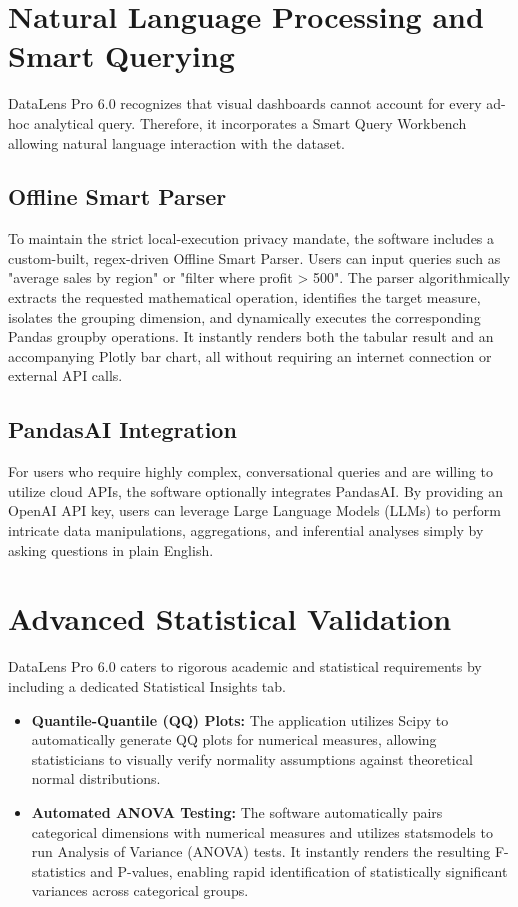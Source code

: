 \documentclass[12pt, a4paper]{article}
\begin{document}
\section{Natural Language Processing and Smart Querying}
DataLens Pro 6.0 recognizes that visual dashboards cannot account for every ad-hoc analytical query. Therefore, it incorporates a Smart Query Workbench allowing natural language interaction with the dataset.
\subsection{Offline Smart Parser}
To maintain the strict local-execution privacy mandate, the software includes a custom-built, regex-driven Offline Smart Parser. Users can input queries such as "average sales by region" or "filter where profit > 500". The parser algorithmically extracts the requested mathematical operation, identifies the target measure, isolates the grouping dimension, and dynamically executes the corresponding Pandas groupby operations. It instantly renders both the tabular result and an accompanying Plotly bar chart, all without requiring an internet connection or external API calls.
\subsection{PandasAI Integration}
For users who require highly complex, conversational queries and are willing to utilize cloud APIs, the software optionally integrates PandasAI. By providing an OpenAI API key, users can leverage Large Language Models (LLMs) to perform intricate data manipulations, aggregations, and inferential analyses simply by asking questions in plain English.
\section{Advanced Statistical Validation}
DataLens Pro 6.0 caters to rigorous academic and statistical requirements by including a dedicated Statistical Insights tab. 
\begin{itemize}
    \item \textbf{Quantile-Quantile (QQ) Plots:} The application utilizes Scipy to automatically generate QQ plots for numerical measures, allowing statisticians to visually verify normality assumptions against theoretical normal distributions.
    \item \textbf{Automated ANOVA Testing:} The software automatically pairs categorical dimensions with numerical measures and utilizes statsmodels to run Analysis of Variance (ANOVA) tests. It instantly renders the resulting F-statistics and P-values, enabling rapid identification of statistically significant variances across categorical groups.
\end{itemize}
\end{document}
